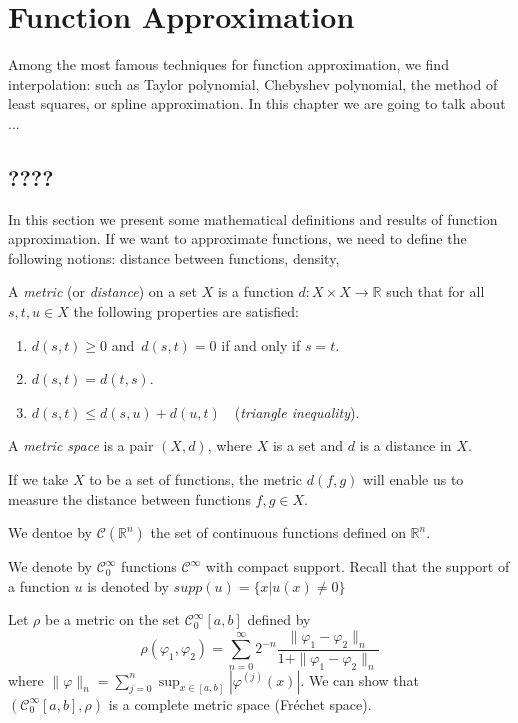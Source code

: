\documentclass[../main.tex]{subfiles}
\begin{document}
\chapter{Function Approximation} \label{ch:methods}
\noindent Among the most famous techniques for function approximation, we find interpolation: such as Taylor polynomial, Chebyshev polynomial, the method of least squares, or spline approximation. In this chapter we are going to talk about ...
\section{????}
\noindent In this section we present some mathematical definitions and results of function approximation. 
If we want to approximate functions, we need to define the following notions: distance between functions, density,


\begin{definition}\label{thm:first}
	A \emph{metric} (or \emph{distance}) on a set $X$ is a function $d:X\times X\rightarrow \mathbb{R} $ such that for all $s,t, u\in X$ the following properties are satisfied:
	\begin{enumerate}
		\item $d(s,t) \geq 0$ and $ \, d(s,t)=0$ if and only if $ s=t$.
		\item $d(s,t)=d(t,s)$.
		\item $d(s,t)\leq d(s,u)+d(u,t)\quad$(\emph{triangle inequality}).
	\end{enumerate}
A \emph{metric space} is a pair $(X,d)$, where $X$ is a set and $d$ is a distance in $X$.
\end{definition}
\noindent  If we take $X$ to be a set of functions, the metric $d(f,g)$ will enable us to measure the distance between functions $f,g \in X$.


\begin{definition} We dentoe by $\mathcal{C}(\mathbb{R}^n)$ the set of continuous functions defined on $\mathbb{R}^n$.
\end{definition}

\begin{definition} We denote by
	$ \mathcal{C}^\infty_0$ functions $\mathcal{C}^\infty$ with compact support. Recall that the support of a function $u$ is denoted by $supp(u)= \{x | u(x)\neq 0\}$
\end{definition}
\begin{propo} 
Let $\rho$ be a metric on the set $\mathcal{C}^\infty_0[a,b]$ defined by
$$\rho(\varphi_1,\varphi_2) = \sum_{n=0}^\infty 2^{-n}  \frac{\|\varphi_1 -\varphi_2\|_n}{1+\|\varphi_1 -\varphi_2\|_n}$$ where $\|\varphi\|_n= \sum_{j=0}^n \sup_{x\in [a,b]} | \varphi^{(j)}(x)| $. We can show that $(\mathcal{C}^\infty_0[a,b],\rho)$  is a complete metric space (Fréchet space).
\end{propo}
\end{document}
